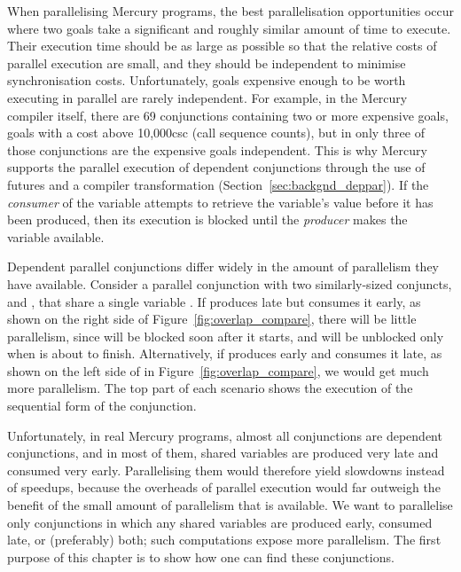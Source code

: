 When parallelising Mercury programs,
the best parallelisation opportunities occur
where two goals take a significant and roughly similar amount of time to
execute.
Their execution time should be as large as possible
so that the relative costs of parallel execution are small,
and they should be independent to minimise synchronisation costs.
Unfortunately, goals expensive enough to be worth executing in parallel
are rarely independent.
For example, in the Mercury compiler itself,
there are 69 conjunctions containing two or more expensive goals,
goals with a cost above 10,000csc (call sequence counts),
but in only three of those conjunctions are the expensive goals independent.
This is why Mercury supports the parallel execution of dependent conjunctions
through the use of futures and a compiler transformation
\citep{wang:2006:hons, wang:2011:dep-par} (Section~\ref{sec:backgnd_deppar}).
If the \emph{consumer} of the variable attempts to retrieve the variable's value
before it has been produced, then its execution is blocked
until the \emph{producer} makes the variable available.


Dependent parallel conjunctions differ widely
in the amount of parallelism they have available.
Consider a parallel conjunction with two similarly-sized conjuncts,
 and , that share a single variable .
If  produces  late but  consumes it early,
as shown on the right side of Figure~\ref{fig:overlap_compare},
there will be little parallelism,
since  will be blocked soon after it starts,
and will be unblocked only when  is about to finish.
Alternatively, if  produces  early
and  consumes it late,
as shown on the left side of in Figure~\ref{fig:overlap_compare},
we would get much more parallelism.
The top part of each scenario
shows the execution of the sequential form of the conjunction.

Unfortunately, in real Mercury programs,
almost all conjunctions are dependent conjunctions,
and in most of them,
shared variables are produced very late and consumed very early.
Parallelising them would therefore yield slowdowns instead of speedups,
because the overheads of parallel execution would far outweigh the
benefit of the small amount of parallelism that is available.
We want to parallelise only conjunctions
in which any shared variables are produced early, consumed late,
or (preferably) both;
such computations expose more parallelism.
The first purpose of this chapter is to show how one can find these conjunctions.

